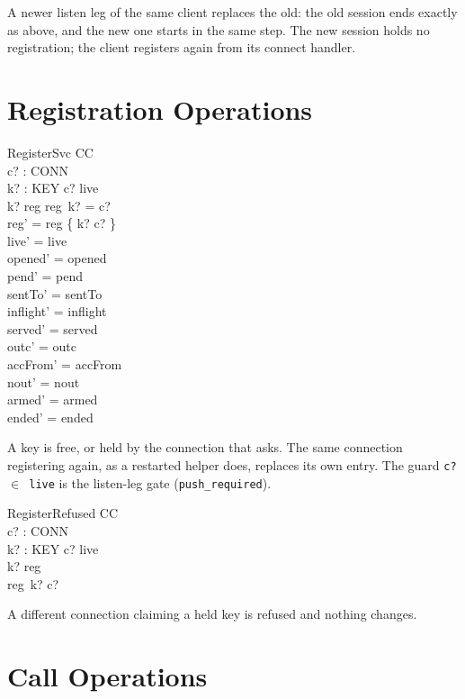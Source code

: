 \documentclass[a4paper,10pt,fleqn]{article}
\begin{document}
A newer listen leg of the same client replaces the old: the old session
ends exactly as above, and the new one starts in the same step.  The new
session holds no registration; the client registers again from its
connect handler.

\section{Registration Operations}

\begin{schema}{RegisterSvc}
  \Delta CC \\
  c? : CONN \\
  k? : KEY
\where
  c? \in live \\
  k? \notin \dom reg \lor reg~k? = c? \\
  reg' = reg \oplus \{ k? \mapsto c? \} \\
  live' = live \\
  opened' = opened \\
  pend' = pend \\
  sentTo' = sentTo \\
  inflight' = inflight \\
  served' = served \\
  outc' = outc \\
  accFrom' = accFrom \\
  nout' = nout \\
  armed' = armed \\
  ended' = ended
\end{schema}

A key is free, or held by the connection that asks.  The same connection
registering again, as a restarted helper does, replaces its own entry.  The
guard \texttt{c? $\in$ live} is the listen-leg gate (\texttt{push\_required}).

\begin{schema}{RegisterRefused}
  \Xi CC \\
  c? : CONN \\
  k? : KEY
\where
  c? \in live \\
  k? \in \dom reg \\
  reg~k? \neq c?
\end{schema}

A different connection claiming a held key is refused and nothing changes.

\section{Call Operations}
\end{document}
